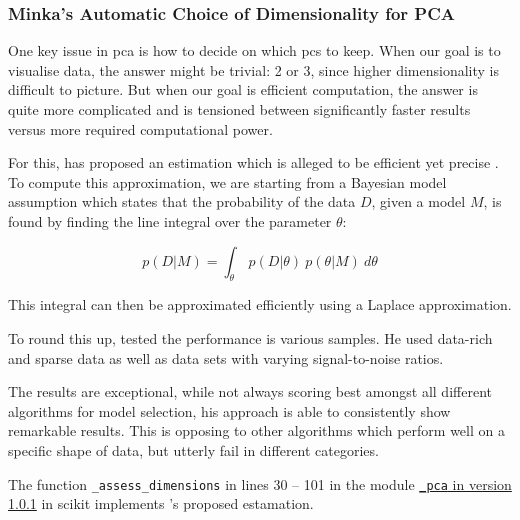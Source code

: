 \clearpage


\subsubsection{Minka's Automatic Choice of Dimensionality for PCA} \label{sec:mle}

One key issue in \acrlong{pca} is how to decide on which \glspl{pc} to keep.
When our goal is to visualise data, the answer might be trivial: 2 or 3, since higher dimensionality is difficult to picture.
But when our goal is efficient computation, the answer is quite more complicated and is tensioned between significantly faster results versus more required computational power.
\bigskip


For this, \citeauthor{minka2000automatic} has proposed an estimation which is alleged to be efficient yet precise \cite{minka2000automatic}.
To compute this approximation, we are starting from a Bayesian model assumption which states that the probability of the data $D$, given a model $M$, is found by finding the line integral over the parameter $\theta$:

\begin{equation}
	\label{formula:minkaMLE}
	p(D | M) = \int_\theta \ p(D | \theta)\ p(\theta | M)\ d\theta
\end{equation}

\medskip\noindent
This integral can then be approximated efficiently using a Laplace approximation.
\bigskip

To round this up, \citeauthor{minka2000automatic} tested the performance is various samples.
He used data-rich and sparse data as well as data sets with varying signal-to-noise ratios.

The results are exceptional, while not always scoring best amongst all different algorithms for model selection, his approach is able to consistently show remarkable results.
This is opposing to other algorithms which perform well on a specific shape of data, but utterly fail in different categories.



\bigskip
The function \texttt{\_assess\_dimensions} in lines 30 -- 101 in the module \href{\scikitPCAvIxOxI{_pca}}{\texttt{\_pca} in version 1.0.1} in \gls{scikit} implements \citeauthor{minka2000automatic}'s proposed estamation.



